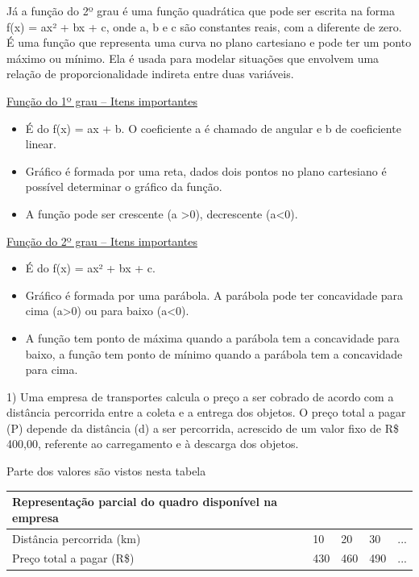\begin{escolha}
{{{\begin{escolha}
{Já a função do 2º grau é uma função quadrática que pode ser escrita na
forma f(x) = ax² + bx + c, onde a, b e c são constantes reais, com a
diferente de zero. É uma função que representa uma curva no plano
cartesiano e pode ter um ponto máximo ou mínimo. Ela é usada para
modelar situações que envolvem uma relação de proporcionalidade indireta
entre duas variáveis.

\ul{Função do 1º grau -- Itens importantes}

\begin{itemize}
\item
  É do f(x) = ax + b. O coeficiente a é chamado de angular e b de
  coeficiente linear.
\item
  Gráfico é formada por uma reta, dados dois pontos no plano cartesiano
  é possível determinar o gráfico da função.
\item
  A função pode ser crescente (a \textgreater0), decrescente
  (a\textless0).
\end{itemize}

\ul{Função do 2º grau -- Itens importantes}

\begin{itemize}
\item
  É do f(x) = ax² + bx + c.
\item
  Gráfico é formada por uma parábola. A parábola pode ter concavidade
  para cima (a\textgreater0) ou para baixo (a\textless0).
\item
  A função tem ponto de máxima quando a parábola tem a concavidade para
  baixo, a função tem ponto de mínimo quando a parábola tem a
  concavidade para cima.
\end{itemize}


1) Uma empresa de transportes calcula o preço a ser cobrado de acordo
com a distância percorrida entre a coleta e a entrega dos objetos. O
preço total a pagar (P) depende da distância (d) a ser percorrida,
acrescido de um valor fixo de R\$ 400,00, referente ao carregamento e à
descarga dos objetos.

Parte dos valores são vistos nesta tabela

\begin{longtable}[]{@{}lllll@{}}
\toprule\noalign{}
\textbf{Representação parcial do quadro disponível na empresa} & & &
& \\
\midrule\noalign{}
\endhead
\bottomrule\noalign{}
\endlastfoot
Distância percorrida (km) & 10 & 20 & 30 & ... \\
Preço total a pagar (R\$) & 430 & 460 & 490 & ... \\
\end{longtable}

}
\end{escolha}}}}
\end{escolha}
